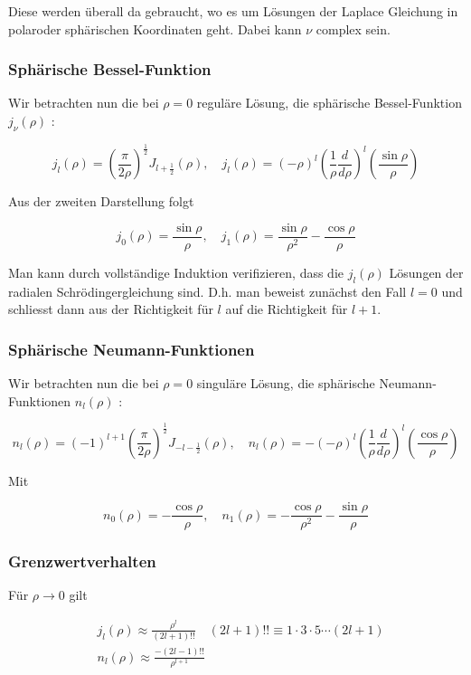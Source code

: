 \documentclass[10pt, letterpaper]{article}
\begin{document}
Diese werden überall da gebraucht, wo es um Lösungen der Laplace Gleichung in polaroder sphärischen Koordinaten geht. Dabei kann $\nu$ complex sein.

\subsubsection*{Sphärische Bessel-Funktion}
Wir betrachten nun die bei $\rho=0$ reguläre Lösung, die sphärische Bessel-Funktion $j_{\nu}(\rho)$ :

$$
j_{l}(\rho)=\left(\frac{\pi}{2 \rho}\right)^{\frac{1}{2}} J_{l+\frac{1}{2}}(\rho), \quad j_{l}(\rho)=(-\rho)^{l}\left(\frac{1}{\rho} \frac{d}{d \rho}\right)^{l}\left(\frac{\sin \rho}{\rho}\right)
$$

Aus der zweiten Darstellung folgt

$$
j_{0}(\rho)=\frac{\sin \rho}{\rho}, \quad j_{1}(\rho)=\frac{\sin \rho}{\rho^{2}}-\frac{\cos \rho}{\rho}
$$

Man kann durch vollständige Induktion verifizieren, dass die $j_{l}(\rho)$ Lösungen der radialen Schrödingergleichung sind. D.h. man beweist zunächst den Fall $l=0$ und schliesst dann aus der Richtigkeit für $l$ auf die Richtigkeit für $l+1$.

\subsubsection*{Sphärische Neumann-Funktionen}
Wir betrachten nun die bei $\rho=0$ singuläre Lösung, die sphärische Neumann-Funktionen $n_{l}(\rho)$ :

$$
n_{l}(\rho)=(-1)^{l+1}\left(\frac{\pi}{2 \rho}\right)^{\frac{1}{2}} J_{-l-\frac{1}{2}}(\rho), \quad n_{l}(\rho)=-(-\rho)^{l}\left(\frac{1}{\rho} \frac{d}{d \rho}\right)^{l}\left(\frac{\cos \rho}{\rho}\right)
$$

Mit

$$
n_{0}(\rho)=-\frac{\cos \rho}{\rho}, \quad n_{1}(\rho)=-\frac{\cos \rho}{\rho^{2}}-\frac{\sin \rho}{\rho}
$$

\subsubsection*{Grenzwertverhalten}
Für $\rho \rightarrow 0$ gilt

$$
\begin{aligned}
& j_{l}(\rho) \approx \frac{\rho^{l}}{(2 l+1)!!} \quad(2 l+1)!!\equiv 1 \cdot 3 \cdot 5 \cdots(2 l+1) \\
& n_{l}(\rho) \approx \frac{-(2 l-1)!!}{\rho^{l+1}}
\end{aligned}
$$
\end{document}

